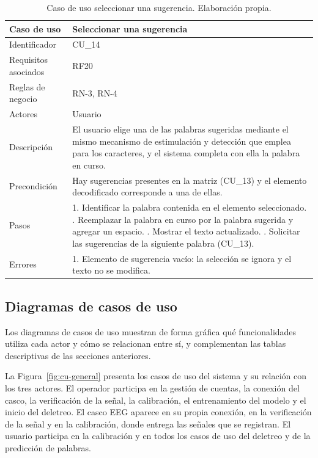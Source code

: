 \begin{table}[H]
\centering
\small
\begin{tabularx}{\textwidth}{|L{3.0cm}|Y|}
\hline
\textbf{Caso de uso} & \textbf{Seleccionar una sugerencia} \\
\hline
Identificador & CU\_14 \\
\hline
Requisitos asociados & RF20 \\
\hline
Reglas de negocio & RN-3, RN-4 \\
\hline
Actores & Usuario \\
\hline
Descripción & El usuario elige una de las palabras sugeridas mediante el mismo mecanismo de estimulación y detección que emplea para los caracteres, y el sistema completa con ella la palabra en curso. \\
\hline
Precondición & Hay sugerencias presentes en la matriz (CU\_13) y el elemento decodificado corresponde a una de ellas. \\
\hline
Pasos & 1. Identificar la palabra contenida en el elemento seleccionado. . Reemplazar la palabra en curso por la palabra sugerida y agregar un espacio. . Mostrar el texto actualizado. . Solicitar las sugerencias de la siguiente palabra (CU\_13). \\
\hline
Errores & 1. Elemento de sugerencia vacío: la selección se ignora y el texto no se modifica. \\
\hline
\end{tabularx}
\caption{Caso de uso seleccionar una sugerencia. Elaboración propia.}
\label{tab:cu14}
\end{table}


\subsection{Diagramas de casos de uso}

Los diagramas de casos de uso muestran de forma gráfica qué funcionalidades utiliza cada actor y
cómo se relacionan entre sí, y complementan las tablas descriptivas de las secciones anteriores.

La Figura~\ref{fig:cu-general} presenta los casos de uso del sistema y su relación con los tres
actores. El operador participa en la gestión de cuentas, la conexión del casco, la verificación de
la señal, la calibración, el entrenamiento del modelo y el inicio del deletreo. El casco EEG aparece
en su propia conexión, en la verificación de la señal y en la calibración, donde entrega las señales
que se registran. El usuario participa en la calibración y en todos los casos de uso del deletreo y
de la predicción de palabras.

